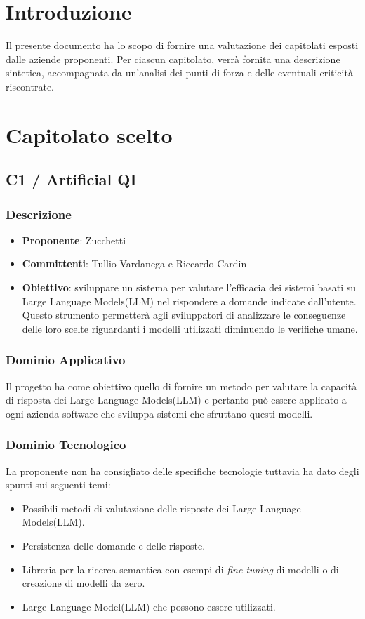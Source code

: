 \documentclass[a4paper, 12pt]{article}
\begin{document}
\tableofcontents

\newpage

\section{Introduzione}
Il presente documento ha lo scopo di fornire una valutazione dei capitolati esposti dalle aziende proponenti.
Per ciascun capitolato, verrà fornita una descrizione sintetica, accompagnata da un’analisi dei punti di forza e delle eventuali criticità riscontrate.

\section{Capitolato scelto}
\label{sec:caps}

\subsection{C1 / Artificial QI}
\subsubsection{Descrizione}
\begin{itemize}
    \item \textbf{Proponente}: Zucchetti
    \item \textbf{Committenti}: Tullio Vardanega e Riccardo Cardin
    \item \textbf{Obiettivo}: sviluppare un sistema per valutare l'efficacia dei sistemi basati su Large Language Models(LLM) nel rispondere a domande indicate dall’utente. 
    Questo strumento permetterà agli sviluppatori di analizzare le conseguenze delle loro scelte riguardanti i modelli utilizzati diminuendo le verifiche umane.     
\end{itemize}

\subsubsection{Dominio Applicativo}
Il progetto ha come obiettivo quello di fornire un metodo per valutare la capacità di risposta dei Large Language Models(LLM) e pertanto può essere applicato a ogni azienda software che sviluppa sistemi che sfruttano questi modelli.

\subsubsection{Dominio Tecnologico}
La proponente non ha consigliato delle specifiche tecnologie tuttavia ha dato degli spunti sui seguenti temi:
\begin{itemize}
    \item Possibili metodi di valutazione delle risposte dei Large Language Models(LLM).
    \item Persistenza delle domande e delle risposte.
    \item Libreria per la ricerca semantica con esempi di \textit{fine tuning} di modelli o di creazione di modelli da zero.
    \item Large Language Model(LLM) che possono essere utilizzati.
\end{itemize}
\end{document}
